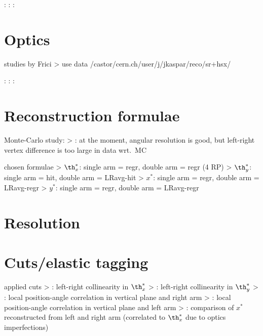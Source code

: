 \>  : 
\>  : 
\>  : 

\section{Optics}

\> studies by Frici
\>> use data /castor/cern.ch/user/j/jkaspar/reco/sr+hsx/

\>  : 
\>  : 
\>  : 


\section{Reconstruction formulae}

\> Monte-Carlo study: 
\>> : at the moment, angular resolution is good, but left-right vertex difference is too large in data wrt.~MC

\> chosen formulae
\>> $\th_x^*$: single arm = regr, double arm = regr (4 RP)
\>> $\th_y^*$: single arm = hit, double arm = LRavg-hit
\>> $x^*$: single arm = regr, double arm = LRavg-regr
\>> $y^*$: single arm = regr, double arm = LRavg-regr 

\section{Resolution}

\> 

\section{Cuts/elastic tagging}

\> applied cuts 
\>>  : left-right collinearity in $\th_x^*$
\>>  : left-right collinearity in $\th_y^*$
\>>  : local position-angle correlation in vertical plane and right arm
\>>  : local position-angle correlation in vertical plane and left arm
\>>  : comparison of $x^*$ reconstructed from left and right arm (correlated to $\th_x^*$ due to optics imperfections)

